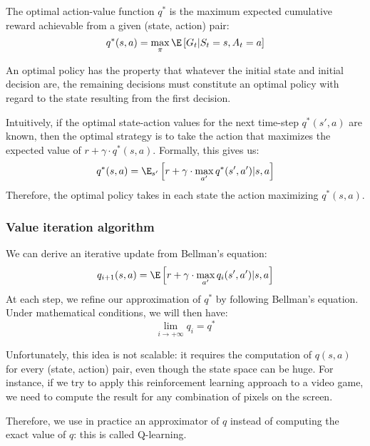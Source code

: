 \begin{definition}
    The optimal action-value function $q^*$ is the maximum expected cumulative reward achievable from a given (state, action) pair:
    \begin{equation*}
        q^*(s,a) = \max_\pi\E\left[G_t|S_t=s,A_t=a\right]
    \end{equation*}
\end{definition}

\begin{theorem}
    An optimal policy has the property that whatever the initial state and initial decision are, the remaining decisions must constitute an optimal policy with regard to the state resulting from the first decision.
\end{theorem}

\begin{property}
    Intuitively, if the optimal state-action values for the next time-step $q^*(s',a)$ are known, then the optimal strategy is to take the action that maximizes the expected value of $r+ \gamma\cdot q^*(s, a)$. Formally, this gives us:
    \begin{equation}
        q^*(s,a) = \E_{s'}\left[r+\gamma\cdot\max_{a'}q^*(s',a')|s,a\right]
    \end{equation}
    Therefore, the optimal policy takes in each state the action maximizing $q^*(s,a)$.
\end{property}

\subsubsection{Value iteration algorithm}
We can derive an iterative update from Bellman's equation:
\begin{equation*}
    q_{i+1}(s,a) = \E\left[r+\gamma\cdot\max_{a'}q_i(s',a')|s,a\right]
\end{equation*}
At each step, we refine our approximation of $q^*$ by following Bellman's equation. Under mathematical conditions, we will then have:
\begin{equation*}
    \lim_{i\to+\infty}q_i = q^*
\end{equation*}

Unfortunately, this idea is not scalable: it requires the computation of $q(s,a)$ for every (state, action) pair, even though the state space can be huge. For instance, if we try to apply this reinforcement learning approach to a video game, we need to compute the result for any combination of pixels on the screen.

Therefore, we use in practice an approximator of $q$ instead of computing the exact value of $q$: this is called Q-learning. 
\newpage